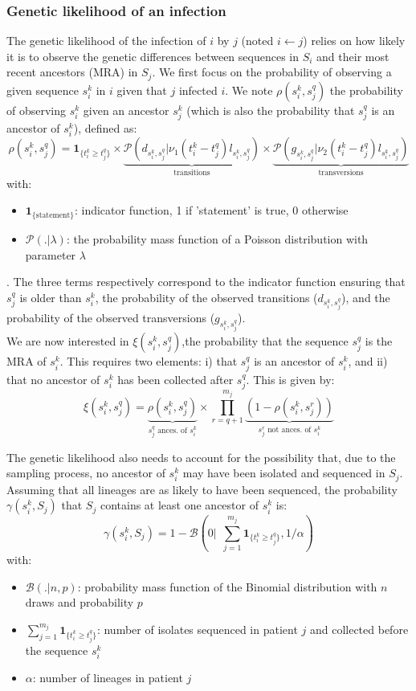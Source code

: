 \documentclass[10pt]{article}
\begin{document}
\subsubsection*{Genetic likelihood of an infection}
The genetic likelihood of the infection of $i$ by $j$ (noted $i \leftarrow j$) relies on how likely it is to observe the genetic differences between sequences in $S_i$ and their most recent ancestors (MRA) in $S_j$.
We first focus on the probability of observing a given sequence $s_i^k$ in $i$ given that $j$ infected $i$.
We note $\rho(s_i^k, s_j^q)$ the probability of observing $s_i^k$ given an ancestor $s_j^k$ (which is also the probability that $s_j^q$ is an ancestor of $s_i^k$), defined as:
$$
\rho(s_i^k, s_j^q) = \mathbf{1}_{\{t_i^k \geq t_j^q\}} \times 
\underbrace{\mathcal{P}\left(d_{s_i^k,s_j^q} | \nu_1 (t_i^k - t_j^q) l_{s_i^k,s_j^q}\right)}_{\mbox{transitions}}
\times \underbrace{\mathcal{P}\left(g_{s_i^k,s_j^q} | \nu_2 (t_i^k - t_j^q) l_{s_i^k,s_j^q}\right)}_{\mbox{transversions}}
$$
with:
\begin{itemize}
\item $\mathbf{1}_{\{\mbox{statement}\}}$: indicator function, 1 if 'statement' is true, 0 otherwise
\item $\mathcal{P}(.|\lambda)$: the probability mass function of a Poisson distribution with parameter $\lambda$
\end{itemize}
. The three terms respectively correspond to the indicator function ensuring that $s_j^q$ is older than $s_i^k$, the probability of the observed transitions ($d_{s_i^k,s_j^q}$), and the probability of the observed transversions ($g_{s_i^k,s_j^q}$). 
\\

We are now interested in $\xi(s_i^k, s_j^q)$,the probability that the sequence $s_j^q$ is the MRA of $s_i^k$.
This requires two elements: i) that $s_j^q$ is an ancestor of $s_i^k$, and ii) that no ancestor of $s_i^k$ has been collected after $s_j^q$.
This is given by:
$$
\xi(s_i^k, s_j^q) = \underbrace{\rho(s_i^k, s_j^q)}_{s_j^q \mbox{ ances. of } s_i^k} \times 
\prod_{r=q+1}^{m_j} \underbrace{(1 - \rho(s_i^k, s_j^r))}_{s_j^r \mbox{ not ances. of } s_i^k}
$$


The genetic likelihood also needs to account for the possibility that, due to the sampling process, no ancestor of $s_i^k$ may have been isolated and sequenced in $S_j$.
Assuming that all lineages are as likely to have been sequenced, the probability $\gamma(s_i^k, S_j)$ that $S_j$ contains at least one ancestor of $s_i^k$ is:
$$
\gamma(s_i^k, S_j) = 1 - \mathcal{B}\left(0 \lvert \:\: \sum_{j=1}^{m_j}\mathbf{1}_{\{t_i^k \geq t_j^q\}}, 1/\alpha \right)
$$
with:
\begin{itemize}
\item $\mathcal{B}(.\lvert n,p)$: probability mass function of the Binomial distribution with $n$ draws and probability $p$
\item $\sum_{j=1}^{m_j}\mathbf{1}_{\{t_i^k \geq t_j^q\}}$: number of isolates sequenced in patient $j$ and collected before the sequence $s_i^k$
\item $\alpha$: number of lineages in patient $j$
\end{itemize}
\end{document}
